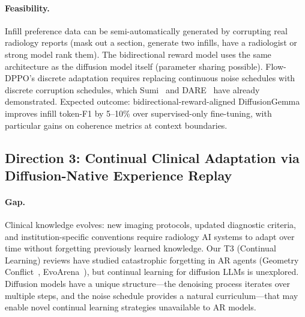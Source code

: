 \documentclass[11pt,a4paper]{article}
\begin{document}
\paragraph{Feasibility.} Infill preference data can be semi-automatically generated by corrupting real radiology reports (mask out a section, generate two infills, have a radiologist or strong model rank them). The bidirectional reward model uses the same architecture as the diffusion model itself (parameter sharing possible). Flow-DPPO's discrete adaptation requires replacing continuous noise schedules with discrete corruption schedules, which Sumi~\cite{sumi2026} and DARE~\cite{dare2026} have already demonstrated. Expected outcome: bidirectional-reward-aligned DiffusionGemma improves infill token-F1 by 5--10\% over supervised-only fine-tuning, with particular gains on coherence metrics at context boundaries.

\subsection{Direction 3: Continual Clinical Adaptation via Diffusion-Native Experience Replay}

\paragraph{Gap.} Clinical knowledge evolves: new imaging protocols, updated diagnostic criteria, and institution-specific conventions require radiology AI systems to adapt over time without forgetting previously learned knowledge. Our T3 (Continual Learning) reviews have studied catastrophic forgetting in AR agents (Geometry Conflict~\cite{geomconflict2026}, EvoArena~\cite{evoarena2026}), but continual learning for diffusion LLMs is unexplored. Diffusion models have a unique structure---the denoising process iterates over multiple steps, and the noise schedule provides a natural curriculum---that may enable novel continual learning strategies unavailable to AR models.
\end{document}

